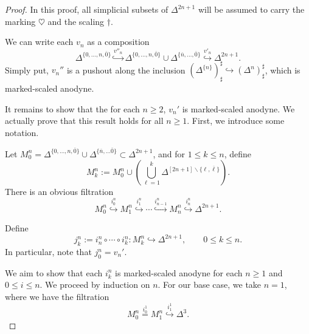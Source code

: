 \documentclass[main.tex]{subfiles}
\begin{document}
\begin{proof}
  In this proof, all simplicial subsets of $\Delta^{2n+1}$ will be assumed to carry the marking $\heartsuit$ and the scaling $\dagger$.

  We can write each $v_{n}$ as a composition
  \begin{equation*}
    \Delta^{\{0, \ldots, n, \overline{0}\}} \overset{v''_{n}}{\hookrightarrow} \Delta^{\{0, \ldots, n, \overline{0}\}} \cup \Delta^{\{\overline{n}, \ldots, \overline{0}\}} \overset{v'_{n}}{\hookrightarrow} \Delta^{2n+1}.
  \end{equation*}
  Simply put, $v_{n}''$ is a pushout along the inclusion $(\Delta^{\{n\}})^{\sharp}_{\sharp} \hookrightarrow (\Delta^{n})^{\sharp}_{\sharp}$, which is marked-scaled anodyne.

  It remains to show that the for each $n \geq 2$, $v_{n}'$ is marked-scaled anodyne. We actually prove that this result holds for all $n \geq 1$. First, we introduce some notation.

  Let $M^{n}_{0} = \Delta^{\{0, \ldots, n, \overline{0}\}} \cup \Delta^{\{\overline{n}, \ldots \overline{0}\}} \subset \Delta^{2n+1}$, and for $1 \leq k \leq n$, define
  \begin{equation*}
    M^{n}_{k} := M^{n}_{0} \cup \left(\bigcup_{\ell = 1}^{k} \Delta^{[2n+1] \smallsetminus \{\ell, \overline{\ell}\}}\right).
  \end{equation*}
  There is an obvious filtration
  \begin{equation}
    \label{eq:filtration_by_adding_sides}
    M^{n}_{0} \overset{i^{n}_{0}}{\hookrightarrow} M^{n}_{1} \overset{i^{n}_{1}}{\hookrightarrow} \cdots \overset{i^{n}_{n-1}}{\hookrightarrow} M^{n}_{n} \overset{i^{n}_{n}}{\hookrightarrow} \Delta^{2n+1}.
  \end{equation}

  Define
  \begin{equation*}
    j^{n}_{k} := i^{n}_{n} \circ \cdots \circ i^{n}_{k}\colon M^{n}_{k} \hookrightarrow \Delta^{2n+1},\qquad 0 \leq k \leq n.
  \end{equation*}
  In particular, note that $j^{n}_{0} = v_{n}'$.

  We aim to show that each $i^{n}_{k}$ is marked-scaled anodyne for each $n \geq 1$ and $0 \leq i \leq n$. We proceed by induction on $n$. For our base case, we take $n=1$, where we have the filtration
  \begin{equation*}
    M^{n}_{0} \overset{i^{1}_{0}}{=} M^{n}_{1} \overset{i^{1}_{1}}{\hookrightarrow} \Delta^{3}.
  \end{equation*}


\end{proof}
\end{document}
